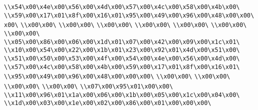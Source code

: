 \verb|\\x54\x00\x4e\x00\x56\x00\x4d\x00\x57\x00\x4c\x00\x58\x00\x4b\x00\|\newline
\verb|\\x59\x00\x17\x01\x8f\x00\x16\x01\x95\x00\x49\x00\x96\x00\x48\x00\x00\x00\|\newline
\verb|\\x00\x00\|\newline
\verb|\\x00\x00\|\newline
\verb|\\x00\x00\|\newline
\verb|\\x00\x00\|\newline
\verb|\\x00\x00\|\newline
\verb|\\x00\x00\|\newline
\verb|\\x00\x00\|\newline
\verb|\\x05\x00\x86\x00\x06\x00\x1d\x01\x07\x00\x42\x00\x09\x00\x1c\x01\|\newline
\verb|\\x10\x00\x54\x00\x22\x00\x1b\x01\x23\x00\x92\x01\x4d\x00\x51\x00\|\newline
\verb|\\x51\x00\x50\x00\x53\x00\x4f\x00\x54\x00\x4e\x00\x56\x00\x4d\x00\|\newline
\verb|\\x57\x00\x4c\x00\x58\x00\x4b\x00\x59\x00\x17\x01\x8f\x00\x16\x01\|\newline
\verb|\\x95\x00\x49\x00\x96\x00\x48\x00\x00\x00\|\newline
\verb|\\x00\x00\|\newline
\verb|\\x00\x00\|\newline
\verb|\\x00\x00\|\newline
\verb|\\x00\x00\|\newline
\verb|\\x07\x00\x95\x01\x00\x00\|\newline
\verb|\\x11\x00\x96\x01\x1a\x00\x06\x00\x1b\x00\x05\x00\x1c\x00\x04\x00\|\newline
\verb|\\x1d\x00\x03\x00\x1e\x00\x02\x00\x86\x00\x01\x00\x00\x00\|\newline
